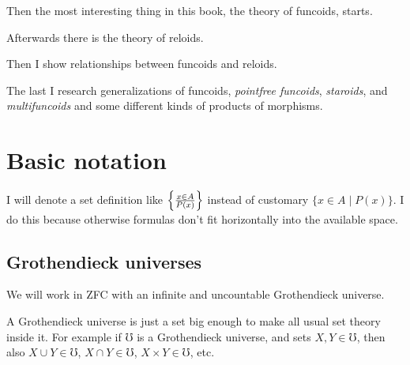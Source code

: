Then the most interesting thing in this book, the theory of funcoids,
starts.

Afterwards there is the theory of reloids.

Then I show relationships between funcoids and reloids.

The last I research generalizations of funcoids, \emph{pointfree funcoids},
\emph{staroids}, and \emph{multifuncoids} and some different kinds
of products of morphisms.


\section{Basic notation}

I will denote a set definition like $\left\{ \frac{x\in A}{P(x)}\right\}$ instead
of customary $\{x\in A\mid P(x)\}$. I do this because otherwise formulas
don't fit horizontally into the available space.


\subsection{Grothendieck universes}

We will work in ZFC with an infinite and uncountable Grothendieck
universe.

A Grothendieck universe is just a set big enough to make all usual
set theory inside it. For example if $\mho$ is a Grothendieck universe,
and sets $X,Y\in\mho$, then also $X\cup Y\in\mho$, $X\cap Y\in\mho$,
$X\times Y\in\mho$, etc.

